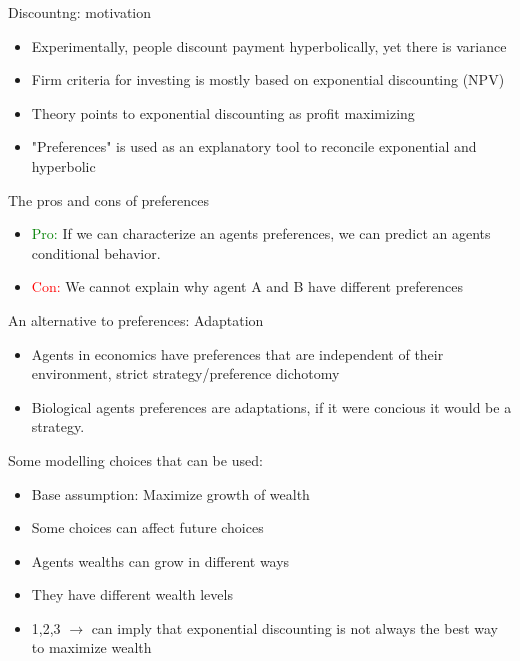 \documentclass{beamer}
\newcommand{\flabel}[1]{\label{fig:#1}}
\numberwithin{equation}{section}
\begin{document}
\begin{frame}{Discountng: motivation}
\begin{itemize}
    \item Experimentally, people discount payment hyperbolically, yet there is variance
    \item Firm criteria for investing is mostly based on exponential discounting (NPV)
    \item Theory points to exponential discounting as profit maximizing
    \item "Preferences" is used as an explanatory tool to reconcile exponential and hyperbolic
\end{itemize}
\end{frame}
\begin{frame}{The pros and cons of preferences}
\begin{itemize}
    \item \textcolor{green}{Pro:} If we can characterize an agents preferences, we can predict an agents conditional behavior. 
    \item \textcolor{red}{Con:} We cannot explain why agent A and B have different preferences
\end{itemize}
\end{frame}
\begin{frame}{An alternative to preferences: Adaptation}
\begin{itemize}
    \item Agents in economics have preferences that are independent of their environment, strict strategy/preference dichotomy
    \item Biological agents preferences are adaptations, if it were concious it would be a strategy. 
\end{itemize}
\end{frame}
\begin{frame}{Some modelling choices that can be used:}
\begin{itemize}
    \item Base assumption: Maximize growth of wealth
    \item Some choices can affect future choices
    \item Agents wealths can grow in different ways
    \item They have different wealth levels
    \item 1,2,3 $\rightarrow$ can imply that exponential discounting is not always the best way to maximize wealth
\end{itemize}
\end{frame}
\end{document}
